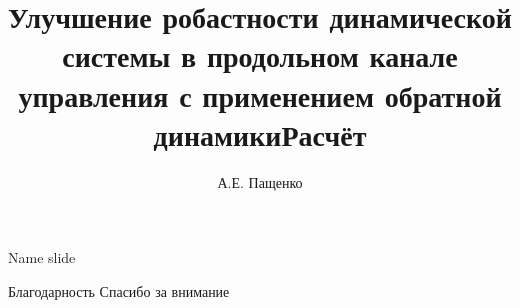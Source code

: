 \documentclass[unicode]{beamer}   %
\title[Дипломная работа]{Улучшение робастности динамической системы в продольном канале управления с применением обратной динамики}
\author{А.Е. Пащенко}
\institute[МАИ]{Московский авиационный институт}
\date{}
\begin{document}
\maketitle

\begin{frame}{Name slide} %
\title{Расчёт}
\end{frame}

\begin{frame}{Благодарность}
\centering
\huge    %
Спасибо за внимание
\end{frame}
\end{document}

